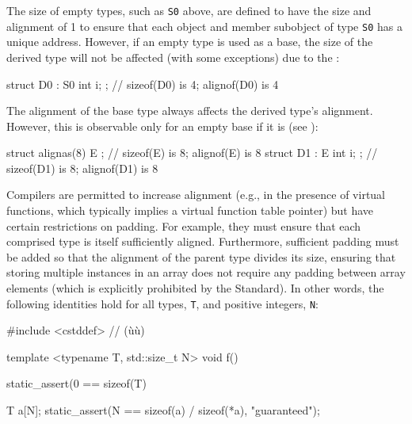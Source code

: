 \noindent The size of empty types, such as \lstinline!S0! above, are defined to have the size and alignment of 1 to ensure that each object and member subobject of type \lstinline!S0! has a unique address. However, if an empty type is used as a base, the size of the derived type will not be affected (with some exceptions) due to the  :

\begin{emcppslisting}[emcppsbatch=e1]
struct D0 : S0 { int i; };  // sizeof(D0) is 4; alignof(D0) is 4
\end{emcppslisting}

The alignment of the base type always affects the derived type's alignment. However, this is observable only for an empty base if it is  (see ):

\begin{emcppslisting}
struct alignas(8) E { };   // sizeof(E)  is 8; alignof(E)  is 8
struct D1 : E { int i; };  // sizeof(D1) is 8; alignof(D1) is 8
\end{emcppslisting}

Compilers are permitted to increase alignment
(e.g., in the presence of virtual functions, which typically implies a virtual function table pointer) but have certain restrictions
on padding. For example, they must ensure that each comprised type is
itself sufficiently aligned.  Furthermore, sufficient padding must be added so that the alignment of the parent type divides its size, ensuring that storing multiple instances in an
array does not require any padding between array elements (which is explicitly prohibited by the Standard). In other words, the following identities hold for all types, \lstinline!T!, and positive integers,
\lstinline!N!:

\begin{emcppslisting}
#include <cstddef>  // (ù{}ù)

template <typename T, std::size_t N>                                            
void f()                                                                        
{                                                                               
    static_assert(0 == sizeof(T) %
                                 
    T a[N];                                                                     
    static_assert(N == sizeof(a) / sizeof(*a), "guaranteed");                                 
}

\end{emcppslisting}
    
